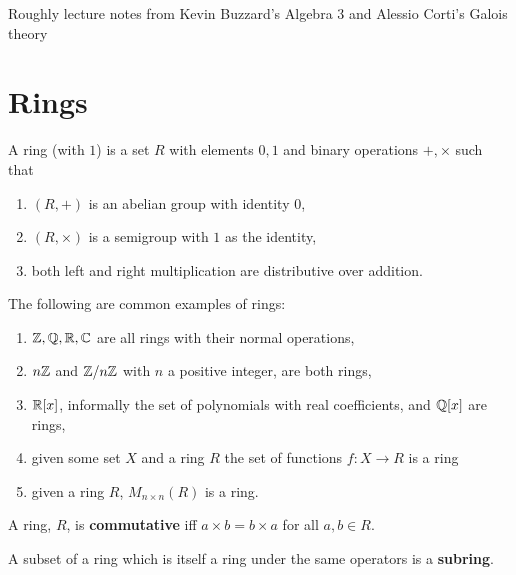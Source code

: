 \documentclass{report}
\begin{document}
\renewcommand*\thesection{\arabic{section}}

Roughly lecture notes from Kevin Buzzard's Algebra 3 and Alessio Corti's Galois theory

\section{Rings}
\setcounter{subsection}{1}

\begin{definition}[Ring]
    A ring (with $1$) is a set $R$ with elements $0,1$ and binary operations $+,\times$ such that \begin{enumerate}
        \item $(R,+)$ is an abelian group with identity $0$,
        \item $(R,\times)$ is a semigroup with $1$ as the identity,
        \item both left and right multiplication are distributive over addition.
    \end{enumerate}
\end{definition}

\begin{examples}
    The following are common examples of rings:
    \begin{enumerate}
        \item  $\mathbb{Z},\mathbb{Q},\mathbb{R},\mathbb{C}$ are all rings with their normal operations,
        \item $n\mathbb{Z}$ and $\mathbb{Z}/n\mathbb{Z}$ with $n$ a positive integer, are both rings,
        \item $\mathbb{R}[x]$, informally the set of polynomials with real coefficients, and $\mathbb{Q}[x]$ are rings,
        \item given some set $X$ and a ring $R$ the set of functions $f:X\rightarrow R$ is a ring
        \item given a ring $R$, $M_{n\times n}(R)$ is a ring.
    \end{enumerate}
\end{examples}

\begin{definition}
    A ring, $R$, is \textbf{commutative} iff $a\times b=b\times a$ for all $a,b\in R$.
\end{definition}

\begin{definition}[Subring]
    A subset of a ring which is itself a ring under the same operators is a \textbf{subring}.
\end{definition}
\end{document}
